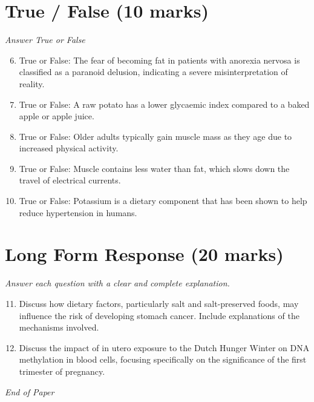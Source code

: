 \documentclass[12pt]{article}
\begin{document}
\section*{True / False (10 marks)}
\textit{Answer True or False}
\begin{enumerate}[label=\arabic*.]
\setcounter{enumi}{5}
\item True or False: The fear of becoming fat in patients with anorexia nervosa is classified as a paranoid delusion, indicating a severe misinterpretation of reality.
\item True or False: A raw potato has a lower glycaemic index compared to a baked apple or apple juice.
\item True or False: Older adults typically gain muscle mass as they age due to increased physical activity.
\item True or False: Muscle contains less water than fat, which slows down the travel of electrical currents.
\item True or False: Potassium is a dietary component that has been shown to help reduce hypertension in humans.
\end{enumerate}

\section*{Long Form Response (20 marks)}
\textit{Answer each question with a clear and complete explanation.}
\begin{enumerate}[label=\arabic*.]
\setcounter{enumi}{10}
\item Discuss how dietary factors, particularly salt and salt-preserved foods, may influence the risk of developing stomach cancer. Include explanations of the mechanisms involved.
\item Discuss the impact of in utero exposure to the Dutch Hunger Winter on DNA methylation in blood cells, focusing specifically on the significance of the first trimester of pregnancy.
\end{enumerate}

\vfill
\noindent\textit{End of Paper}
\end{document}
